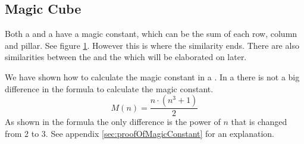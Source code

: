\subsection{Magic Cube}
\label{sub:mcube}






\begin{figure}[b]
	\centering
		\hspace{0.02\textwidth}
		\hspace{0.02\textwidth}
		\caption{}
		\label{fig:presentMagicCube}
\end{figure}



Both a \msquare{} and a \mcube{} have a magic constant, which can be the sum of each row, column and pillar. See figure \ref{fig:presentMagicCube}.
 However this is where the similarity ends. There are also similarities between the \mcube{} and the \rubik{} which will be elaborated on later. 

We have shown how to calculate the magic constant in a \msquare{}.
In a  \mcube{} there is not a big difference in the formula to calculate the magic constant.
\begin{equation}
	M(n)=\frac{n \cdot (n^3+1)}{2}
\end{equation}
As shown in the formula the only difference is the power of $n$ that is changed from 2 to 3.
See appendix \ref{sec:proofOfMagicConstant} for an explanation.

